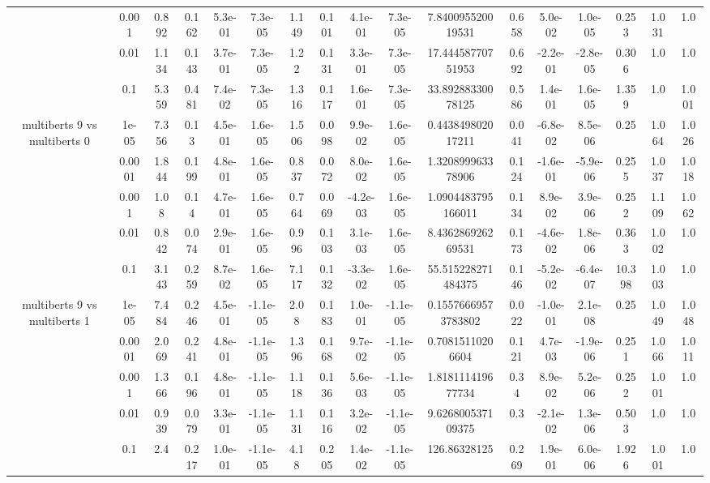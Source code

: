 \begin{tabular}{|c|c|c|c|c|c|c|c|c|c|c|c|c|c|c|c|c|}
 & 0.001 & 0.892 & 0.162 & 5.3e-01 & 7.3e-05 & 1.149 & 0.101 & 4.1e-01 & 7.3e-05 & 7.840095520019531 & 0.658 & 5.0e-02 & 1.0e-05 & 0.253 & 1.031 & 1.0 \\
 & 0.01 & 1.134 & 0.143 & 3.7e-01 & 7.3e-05 & 1.22 & 0.131 & 3.3e-01 & 7.3e-05 & 17.44458770751953 & 0.692 & -2.2e-01 & -2.8e-05 & 0.306 & 1.0 & 1.0 \\
 & 0.1 & 5.359 & 0.481 & 7.4e-02 & 7.3e-05 & 1.316 & 0.117 & 1.6e-01 & 7.3e-05 & 33.89288330078125 & 0.586 & 1.4e-01 & 1.6e-05 & 1.359 & 1.0 & 1.001 \\
\hline
\multirow{5}{*}{multiberts 9 vs multiberts 0} & 1e-05 & 7.356 & 0.13 & 4.5e-01 & 1.6e-05 & 1.506 & 0.098 & 9.9e-02 & 1.6e-05 & 0.443849802017211 & 0.041 & -6.8e-02 & 8.5e-06 & 0.25 & 1.064 & 1.026 \\
 & 0.0001 & 1.844 & 0.199 & 4.8e-01 & 1.6e-05 & 0.837 & 0.072 & 8.0e-02 & 1.6e-05 & 1.320899963378906 & 0.124 & -1.6e-01 & -5.9e-06 & 0.255 & 1.037 & 1.018 \\
 & 0.001 & 1.08 & 0.14 & 4.7e-01 & 1.6e-05 & 0.764 & 0.069 & -4.2e-03 & 1.6e-05 & 1.0904483795166011 & 0.134 & 8.9e-02 & 3.9e-06 & 0.252 & 1.109 & 1.062 \\
 & 0.01 & 0.842 & 0.074 & 2.9e-01 & 1.6e-05 & 0.996 & 0.103 & 3.1e-03 & 1.6e-05 & 8.436286926269531 & 0.173 & -4.6e-02 & 1.8e-06 & 0.363 & 1.002 & 1.0 \\
 & 0.1 & 3.143 & 0.259 & 8.7e-02 & 1.6e-05 & 7.117 & 0.132 & -3.3e-02 & 1.6e-05 & 55.515228271484375 & 0.146 & -5.2e-02 & -6.4e-07 & 10.398 & 1.003 & 1.0 \\
\hline
\multirow{5}{*}{multiberts 9 vs multiberts 1} & 1e-05 & 7.484 & 0.246 & 4.5e-01 & -1.1e-05 & 2.08 & 0.183 & 1.0e-01 & -1.1e-05 & 0.15576669573783802 & 0.022 & -1.0e-01 & 2.1e-08 & 0.25 & 1.049 & 1.048 \\
 & 0.0001 & 2.069 & 0.241 & 4.8e-01 & -1.1e-05 & 1.396 & 0.168 & 9.7e-02 & -1.1e-05 & 0.70815110206604 & 0.121 & 4.7e-03 & -1.9e-06 & 0.251 & 1.066 & 1.011 \\
 & 0.001 & 1.366 & 0.196 & 4.8e-01 & -1.1e-05 & 1.118 & 0.136 & 5.6e-03 & -1.1e-05 & 1.818111419677734 & 0.34 & 8.9e-02 & 5.2e-06 & 0.252 & 1.001 & 1.0 \\
 & 0.01 & 0.939 & 0.079 & 3.3e-01 & -1.1e-05 & 1.131 & 0.116 & 3.2e-02 & -1.1e-05 & 9.626800537109375 & 0.3 & -2.1e-02 & 1.3e-06 & 0.503 & 1.0 & 1.0 \\
 & 0.1 & 2.4 & 0.217 & 1.0e-01 & -1.1e-05 & 4.18 & 0.205 & 1.4e-02 & -1.1e-05 & 126.86328125 & 0.269 & 1.9e-01 & 6.0e-06 & 1.926 & 1.001 & 1.0 \\

\end{tabular}
